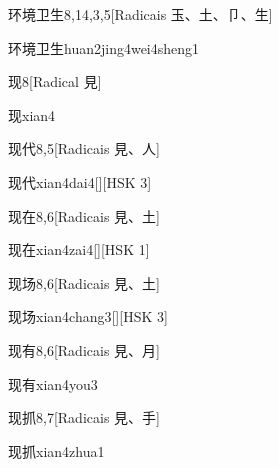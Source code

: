 \begin{entry}{环境卫生}{8,14,3,5}[Radicais ⽟、⼟、⼙、⽣]
  \begin{phonetics}{环境卫生}{huan2jing4wei4sheng1}
  \end{phonetics}
\end{entry}

\begin{entry}{现}{8}[Radical ⾒]
  \begin{phonetics}{现}{xian4}
  \end{phonetics}
\end{entry}

\begin{entry}{现代}{8,5}[Radicais ⾒、⼈]
  \begin{phonetics}{现代}{xian4dai4}[][HSK 3]
  \end{phonetics}
\end{entry}

\begin{entry}{现在}{8,6}[Radicais ⾒、⼟]
  \begin{phonetics}{现在}{xian4zai4}[][HSK 1]
  \end{phonetics}
\end{entry}

\begin{entry}{现场}{8,6}[Radicais ⾒、⼟]
  \begin{phonetics}{现场}{xian4chang3}[][HSK 3]
  \end{phonetics}
\end{entry}

\begin{entry}{现有}{8,6}[Radicais ⾒、⽉]
  \begin{phonetics}{现有}{xian4you3}
  \end{phonetics}
\end{entry}

\begin{entry}{现抓}{8,7}[Radicais ⾒、⼿]
  \begin{phonetics}{现抓}{xian4zhua1}
  \end{phonetics}
\end{entry}

